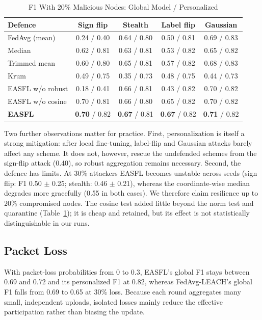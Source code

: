 \documentclass[journal,onecolumn,draftclsnofoot,12pt]{IEEEtran}
\begin{document}
\begin{table}[t]
\caption{F1 With 20\% Malicious Nodes: Global Model / Personalized}\label{tab:pois}
\centering\scriptsize
\setlength{\tabcolsep}{3pt}
\begin{tabular}{@{}lcccc@{}}
\toprule
Defence & Sign flip & Stealth & Label flip & Gaussian\\
\midrule
FedAvg (mean) & 0.24 / 0.40 & 0.64 / 0.80 & 0.50 / 0.81 & 0.69 / 0.83\\
Median & 0.62 / 0.81 & 0.63 / 0.81 & 0.53 / 0.82 & 0.65 / 0.82\\
Trimmed mean & 0.60 / 0.80 & 0.65 / 0.81 & 0.57 / 0.82 & 0.68 / 0.83\\
Krum & 0.49 / 0.75 & 0.35 / 0.73 & 0.48 / 0.75 & 0.44 / 0.73\\
EASFL w/o robust & 0.18 / 0.41 & 0.66 / 0.81 & 0.43 / 0.82 & 0.70 / 0.82\\
EASFL w/o cosine & 0.70 / 0.81 & 0.66 / 0.80 & 0.65 / 0.82 & 0.70 / 0.82\\
\textbf{EASFL} & \textbf{0.70} / 0.82 & \textbf{0.67} / 0.81 & \textbf{0.67} / 0.82 & \textbf{0.71} / 0.82\\
\bottomrule
\end{tabular}
\end{table}

Two further observations matter for practice. First, personalization is itself a strong mitigation: after local fine-tuning, label-flip and Gaussian attacks barely affect any scheme. It does not, however, rescue the undefended schemes from the sign-flip attack (0.40), so robust aggregation remains necessary. Second, the defence has limits. At 30\% attackers EASFL becomes unstable across seeds (sign flip: F1 0.50 $\pm$ 0.25; stealth: 0.46 $\pm$ 0.21), whereas the coordinate-wise median degrades more gracefully (0.55 in both cases). We therefore claim resilience up to 20\% compromised nodes. The cosine test added little beyond the norm test and quarantine (Table~\ref{tab:pois}); it is cheap and retained, but its effect is not statistically distinguishable in our runs.

\subsection{Packet Loss}
With packet-loss probabilities from 0 to 0.3, EASFL's global F1 stays between 0.69 and 0.72 and its personalized F1 at 0.82, whereas FedAvg-LEACH's global F1 falls from 0.69 to 0.65 at 30\% loss. Because each round aggregates many small, independent uploads, isolated losses mainly reduce the effective participation rather than biasing the update.
\end{document}
